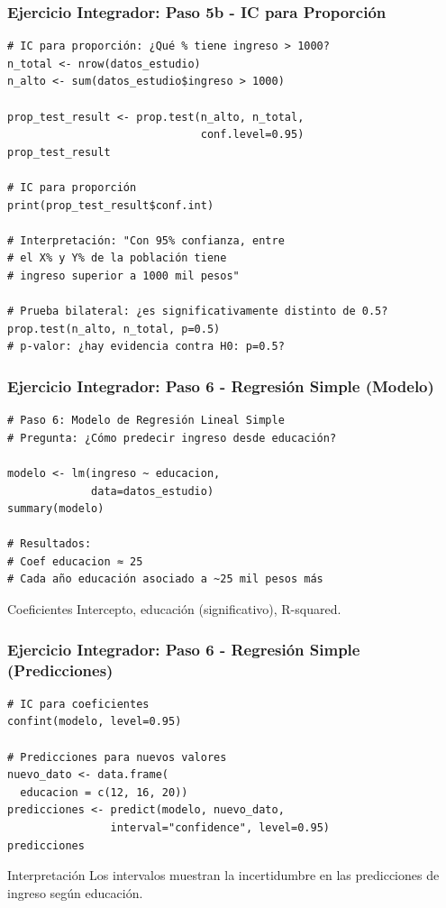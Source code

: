 \documentclass[aspectratio=169,11pt]{beamer}
\begin{document}
\begin{frame}[fragile]
\frametitle{Ejercicio Integrador: Paso 5b - IC para Proporción}
\begin{lstlisting}
# IC para proporción: ¿Qué % tiene ingreso > 1000?
n_total <- nrow(datos_estudio)
n_alto <- sum(datos_estudio$ingreso > 1000)

prop_test_result <- prop.test(n_alto, n_total,
                              conf.level=0.95)
prop_test_result

# IC para proporción
print(prop_test_result$conf.int)

# Interpretación: "Con 95% confianza, entre
# el X% y Y% de la población tiene
# ingreso superior a 1000 mil pesos"

# Prueba bilateral: ¿es significativamente distinto de 0.5?
prop.test(n_alto, n_total, p=0.5)
# p-valor: ¿hay evidencia contra H0: p=0.5?
\end{lstlisting}
\end{frame}

\begin{frame}[fragile]
\frametitle{Ejercicio Integrador: Paso 6 - Regresión Simple (Modelo)}
\begin{lstlisting}
# Paso 6: Modelo de Regresión Lineal Simple
# Pregunta: ¿Cómo predecir ingreso desde educación?

modelo <- lm(ingreso ~ educacion,
             data=datos_estudio)
summary(modelo)

# Resultados:
# Coef educacion ≈ 25
# Cada año educación asociado a ~25 mil pesos más
\end{lstlisting}

\pause
\begin{exampleblock}{Coeficientes}
  Intercepto, educación (significativo), R-squared.
\end{exampleblock}
\end{frame}

\begin{frame}[fragile]
\frametitle{Ejercicio Integrador: Paso 6 - Regresión Simple (Predicciones)}
\begin{lstlisting}
# IC para coeficientes
confint(modelo, level=0.95)

# Predicciones para nuevos valores
nuevo_dato <- data.frame(
  educacion = c(12, 16, 20))
predicciones <- predict(modelo, nuevo_dato,
                interval="confidence", level=0.95)
predicciones
\end{lstlisting}

\vspace{0.15cm}
\begin{exampleblock}{Interpretación}
  Los intervalos muestran la incertidumbre en las predicciones de ingreso según educación.
\end{exampleblock}
\end{frame}
\end{document}
